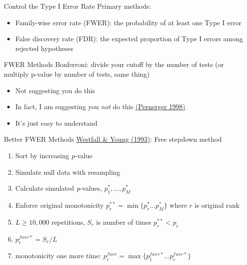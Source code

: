 \documentclass{beamer}
\begin{document}
\begin{frame}{Control the Type I Error Rate}
Primary methods:
\begin{itemize}
\item Family-wise error rate (FWER): the probability of at least one Type I error
\item False discovery rate (FDR): the expected proportion of Type I errors among rejected hypotheses
\end{itemize}
\end{frame}

\begin{frame}{FWER Methods}
Bonferroni: divide your cutoff by the number of tests (or multiply p-value by number of tests, same thing)
\begin{itemize}
\item Not suggesting you do this
\item In fact, I am suggesting you \textit{not} do this 
\href{https://www.ncbi.nlm.nih.gov/pmc/articles/PMC1112991/}{(Pernerger 1998)}
\item It's just easy to understand
\end{itemize}
\end{frame}

\begin{frame}{Better FWER Methods}
\href{http://www.jstor.org/stable/2532216}{Westfall \& Young (1993)}: Free stepdown method
\begin{enumerate}
\item Sort by increasing \textit{p}-value
\item Simulate null data with resampling
\item Calculate simulated \textit{p}-values, $p^*_1, \ldots ,p^*_M$
\item Enforce original monotonicity $p^{**}_r=\min \{p^*_r \ldots p^*_M\}$ where $r$ is original rank
\item $L \geq 10,000$ repetitions, $S_r$ is number of times $p^{**}_r  < p_r$
\item $p_r^{fwer*}=S_r/L$
\item monotonicity one more time: $p_r^{fwer}=\max \{p_1^{fwer*} \ldots p_r^{fwer*} \}$

\end{enumerate}


\end{frame}
\end{document}
